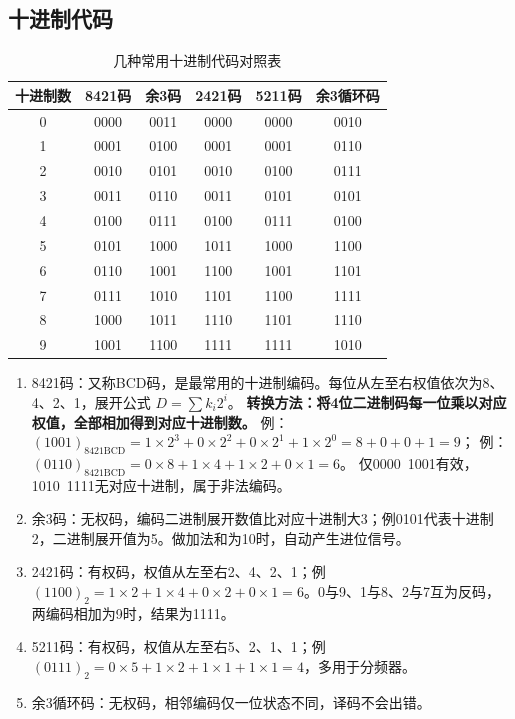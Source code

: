 \subsection{十进制代码}
\begin{table}[!htbp]
    \centering
    \setlength{\tabcolsep}{5pt}
    \renewcommand{\arraystretch}{1.2}
    \caption{几种常用十进制代码对照表}
    \label{tab:bcd_all}
    \begin{tabular}{|c|c|c|c|c|c|}
        \hline
        十进制数 & 8421码 & 余3码 & 2421码 & 5211码 & 余3循环码 \\
        \hline
        0 & 0000 & 0011 & 0000 & 0000 & 0010 \\
        1 & 0001 & 0100 & 0001 & 0001 & 0110 \\
        2 & 0010 & 0101 & 0010 & 0100 & 0111 \\
        3 & 0011 & 0110 & 0011 & 0101 & 0101 \\
        4 & 0100 & 0111 & 0100 & 0111 & 0100 \\
        5 & 0101 & 1000 & 1011 & 1000 & 1100 \\
        6 & 0110 & 1001 & 1100 & 1001 & 1101 \\
        7 & 0111 & 1010 & 1101 & 1100 & 1111 \\
        8 & 1000 & 1011 & 1110 & 1101 & 1110 \\
        9 & 1001 & 1100 & 1111 & 1111 & 1010 \\
        \hline
    \end{tabular}
\end{table}
\begin{enumerate}
    \item 8421码：又称BCD码，是最常用的十进制编码。每位从左至右权值依次为8、4、2、1，展开公式 $D=\sum k_i 2^i$。
    \textbf{转换方法：将4位二进制码每一位乘以对应权值，全部相加得到对应十进制数。}
    例：$(1001)_{\text{8421BCD}}=1\times 2^3+0\times 2^2+0\times 2^1+1\times 2^0=8+0+0+1=9$；
    例：$(0110)_{\text{8421BCD}}=0\times 8+1\times 4+1\times 2+0\times 1=6$。
    仅0000~1001有效，1010~1111无对应十进制，属于非法编码。

    \item 余3码：无权码，编码二进制展开数值比对应十进制大3；例0101代表十进制2，二进制展开值为5。做加法和为10时，自动产生进位信号。

    \item 2421码：有权码，权值从左至右2、4、2、1；例$(1100)_2=1\times 2+1\times 4+0\times 2+0\times 1=6$。0与9、1与8、2与7互为反码，两编码相加为9时，结果为1111。

    \item 5211码：有权码，权值从左至右5、2、1、1；例$(0111)_2=0\times 5+1\times 2+1\times 1+1\times 1=4$，多用于分频器。

    \item 余3循环码：无权码，相邻编码仅一位状态不同，译码不会出错。
\end{enumerate}


